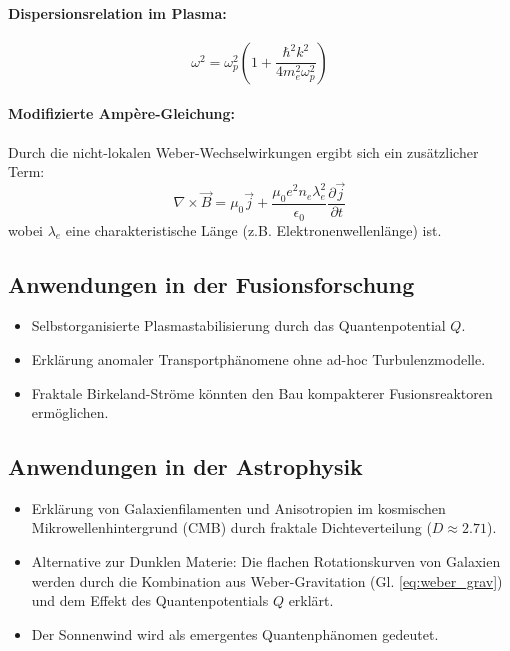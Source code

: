 \documentclass[11pt, a4paper]{article}
\begin{document}
\paragraph{Dispersionsrelation im Plasma:}
\begin{equation}
\label{eq:dispersion}
\omega^2 = \omega_p^2 \left( 1 + \frac{\hbar^2 k^2}{4m_e^2 \omega_p^2} \right)
\end{equation}

\paragraph{Modifizierte Ampère-Gleichung:}
Durch die nicht-lokalen Weber-Wechselwirkungen ergibt sich ein zusätzlicher Term:
\begin{equation}
\label{eq:ampere_mod}
\nabla \times \vec{B} = \mu_0 \vec{j} + \frac{\mu_0 e^2 n_e \lambda_e^2}{\epsilon_0} \frac{\partial \vec{j}}{\partial t}
\end{equation}
wobei $\lambda_e$ eine charakteristische Länge (z.B. Elektronenwellenlänge) ist.

\subsection{Anwendungen in der Fusionsforschung}
\label{subsec:fusion}
\begin{itemize}
    \item Selbstorganisierte Plasmastabilisierung durch das Quantenpotential $Q$.
    \item Erklärung anomaler Transportphänomene ohne ad-hoc Turbulenzmodelle.
    \item Fraktale Birkeland-Ströme könnten den Bau kompakterer Fusionsreaktoren ermöglichen.
\end{itemize}

\subsection{Anwendungen in der Astrophysik}
\label{subsec:astro}
\begin{itemize}
    \item Erklärung von Galaxienfilamenten und Anisotropien im kosmischen Mikrowellenhintergrund (CMB) durch fraktale Dichteverteilung ($D \approx 2.71$).
    \item Alternative zur Dunklen Materie: Die flachen Rotationskurven von Galaxien werden durch die Kombination aus Weber-Gravitation (Gl. \ref{eq:weber_grav}) und dem Effekt des Quantenpotentials $Q$ erklärt.
    \item Der Sonnenwind wird als emergentes Quantenphänomen gedeutet.
\end{itemize}
\end{document}
